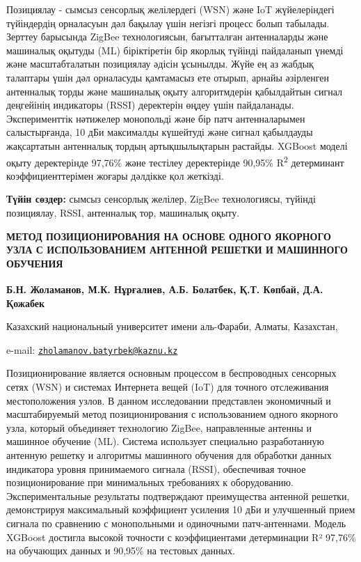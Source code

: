 Позициялау - сымсыз сенсорлық желілердегі (WSN) және IoT жүйелеріндегі
түйіндердің орналасуын дәл бақылау үшін негізгі процесс болып табылады.
Зерттеу барысында ZigBee технологиясын, бағытталған антенналарды және
машиналық оқытуды (ML) біріктіретін бір якорлық түйінді пайдаланып
үнемді және масштабталатын позициялау әдісін ұсынылды. Жүйе ең аз жабдық
талаптары үшін дәл орналасуды қамтамасыз ете отырып, арнайы әзірленген
антенналық торды және машиналық оқыту алгоритмдерін қабылдайтын сигнал
деңгейінің индикаторы (RSSI) деректерін өңдеу үшін пайдаланады.
Эксперименттік нәтижелер монопольді және бір патч антенналарымен
салыстырғанда, 10 дБи максималды күшейтуді және сигнал қабылдауды
жақсартатын антенналық тордың артықшылықтарын растайды. XGBoost моделі
оқыту деректерінде 97,76\% және тестілеу деректерінде 90,95\%
R\textsuperscript{2} детерминант коэффициенттерімен жоғары дәлдікке қол
жеткізді.

{\bfseries Түйін сөздер:} сымсыз сенсорлық желілер, ZigBee технологиясы,
түйінді позициялау, RSSI, антенналық тор, машиналық оқыту.

\begin{articleheader}
{\bfseries МЕТОД ПОЗИЦИОНИРОВАНИЯ НА ОСНОВЕ ОДНОГО ЯКОРНОГО УЗЛА С
ИСПОЛЬЗОВАНИЕМ АНТЕННОЙ РЕШЕТКИ И МАШИННОГО ОБУЧЕНИЯ}

{\bfseries
Б.Н. Жоламанов\textsuperscript{\envelope },
М.К. Нұрғалиев,
А.Б. Болатбек,
Қ.Т. Көпбай,
Д.А. Қожабек
}
\end{articleheader}

\begin{affiliation}
Казахский национальный университет имени аль-Фараби, Алматы, Казахстан,

e-mail: \href{mailto:zholamanov.batyrbek@kaznu.kz}{\nolinkurl{zholamanov.batyrbek@kaznu.kz}}
\end{affiliation}

Позиционирование является основным процессом в беспроводных сенсорных
сетях (WSN) и системах Интернета вещей (IoT) для точного отслеживания
местоположения узлов. В данном исследовании представлен экономичный и
масштабируемый метод позиционирования с использованием одного якорного
узла, который объединяет технологию ZigBee, направленные антенны и
машинное обучение (ML). Система использует специально разработанную
антенную решетку и алгоритмы машинного обучения для обработки данных
индикатора уровня принимаемого сигнала (RSSI), обеспечивая точное
позиционирование при минимальных требованиях к оборудованию.
Экспериментальные результаты подтверждают преимущества антенной решетки,
демонстрируя максимальный коэффициент усиления 10 дБи и улучшенный прием
сигнала по сравнению с монопольными и одиночными патч-антеннами. Модель
XGBoost достигла высокой точности с коэффициентами детерминации R²
97,76\% на обучающих данных и 90,95\% на тестовых данных.

